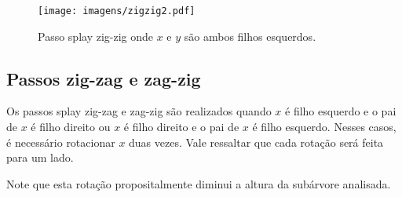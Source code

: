{\begin{figure}[H]
\begin{comment}
        \begin{scope}[local bounding box=scope1]
        \Tree [.$z$  [.$y$ [.$x$ \node[alpha]{a}; \node[alpha]{b}; ] \node[alpha]{c};] \node[alpha]{d};]
        \end{scope}
        
        \begin{scope}[xshift=6cm, local bounding box=scope2]
        \Tree [.$x$ \node[alpha]{a}; [.$y$ \node[alpha]{b}; [.$z$ \node[alpha]{c}; \node[alpha]{d}; ]]]
        \end{scope}
        
        \draw[->] ([yshift=-0.5*\ht\strutbox,xshift=0.5cm]scope1.east) -- node [n] {} ([yshift=-0.5*\ht\strutbox,xshift=-0.5cm]scope2.west); %
        
        \draw[->] ([yshift=-2.20cm, xshift=-0.98cm]scope1.north) arc (198:-18:0.7cm);
        \draw[->,red] ([yshift=-3.67cm, xshift=-1.89cm]scope1.north) arc (198:-18:0.7cm);
    
    \end{tikzpicture}
    \end{comment}
    \texttt{[image: imagens/zigzig2.pdf]}
    \label{fig:zigzig}
\caption{Passo splay zig-zig onde $x$ e $y$ são ambos filhos esquerdos.}
\end{figure}


\subsection{Passos zig-zag e zag-zig}

Os passos splay zig-zag e zag-zig são realizados quando $x$ é filho esquerdo e o pai de $x$ é filho direito ou $x$ é filho direito e o pai de $x$ é filho esquerdo. Nesses casos, é necessário rotacionar $x$ duas vezes. Vale ressaltar que cada rotação será feita para um lado.

Note que esta rotação propositalmente diminui a altura da subárvore analisada.
    
\begin{figure}[H]
    \centering
    \begin{comment}
    \begin{tikzpicture}[
        ed/.style = {densely dashed, shorten >= 5pt},
        alpha/.style = {regular polygon, regular polygon sides=3, draw, minimum size=1.1cm, inner sep=2pt, anchor=south},
        level distance=1.5cm,
        sibling distance=0.25cm
        ]

        \begin{scope}[local bounding box=scope1]
            \Tree [.$z$  [.$y$ \node[alpha]{a}; [.$x$ \node[alpha]{b}; \node[alpha]{c}; ]] \node[alpha]{d};]
        \end{scope}
        

\end{comment}
\end{figure}}

